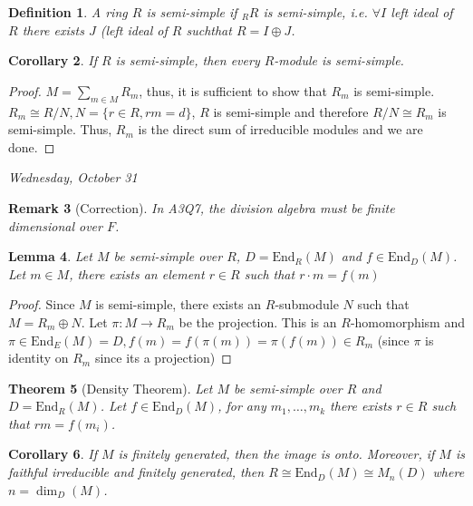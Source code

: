 \documentclass[letterpaper, leqno, 12pt]{article}
\newcommand{\fin}{\qquad \quad \hfill \framebox[1.75mm][l]{\,}}
\newcommand{\End}{\mbox{End}}
\theoremstyle{stdthm}
\newtheorem{thm}{Theorem}
\newtheorem{lem}[thm]{Lemma}
\newtheorem{cor}[thm]{Corollary}
\theoremstyle{stddef}
\newtheorem{defn}[thm]{Definition}
\newtheorem{rem}[thm]{Remark} %
\theoremstyle{stdnonum}
\theoremstyle{stdqands}
\theoremstyle{stdbold}
\begin{document}
\begin{defn}
A ring $R$ is semi-simple if $_RR$ is semi-simple, i.e. $\forall I$ left ideal of $R$ there exists $J$ (left ideal of $R$ suchthat $R = I \oplus J$. 
\end{defn}

\begin{cor}
If $R$ is semi-simple, then every $R$-module is semi-simple.
\end{cor}

\begin{proof}
$M  = \sum_{m \in M} R_m$, thus, it is sufficient to show that $R_m$ is semi-simple. $R_m \cong R/N, N = \{r \in R, rm = d\}$, $R$ is semi-simple and therefore $R/N \cong R_m$ is semi-simple. Thus, $R_m$ is the direct sum of irreducible modules and we are done. 
\end{proof}

\begin{center}
\emph{Wednesday, October 31}
\end{center}

\begin{rem} [Correction]
In A3Q7, the division algebra must be finite dimensional over $F$. 
\end{rem}


\begin{lem}
Let $M$ be semi-simple over $R$, $D = \End_R(M)$ and $f \in \End_D(M)$. Let $m \in M$, there exists an element $r \in R$ such that $r\cdot m= f(m)$
\end{lem}

\begin{proof}
Since $M$ is semi-simple, there exists an $R$-submodule $N$ such that $M = R_m \oplus N$. Let $\pi: M\rightarrow R_m$ be the projection. This is an $R$-homomorphism and $\pi \in \End_E(M) = D, f(m) = f(\pi(m)) = \pi(f(m)) \in R_m$ (since $\pi$ is identity on $R_m$ since its a projection) 
\end{proof}

\begin{thm} [Density Theorem]
Let $M$ be semi-simple over $R$ and $D = \End_R(M)$. Let $f \in \End_D(M)$, for any $m_1,\dots, m_k$ there exists $r \in R$ such that $rm = f(m_i)$. 
\end{thm}

\begin{cor}
If $M$ is finitely generated, then the image is onto. Moreover, if $M$ is faithful irreducible and finitely generated, then $R \cong \End_D(M) \cong M_n(D)$ where $n = \dim_D(M)$. 
\end{cor}
\end{document}
